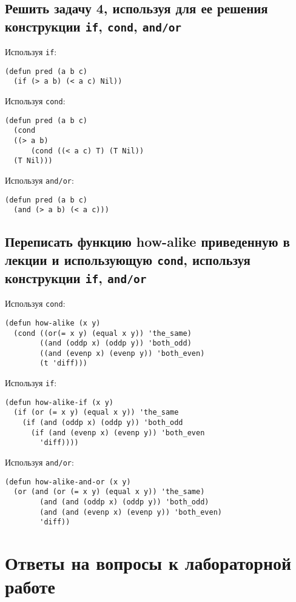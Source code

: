 \section{Решить задачу 4, используя для ее решения конструкции \texttt{if}, \texttt{cond}, \texttt{and/or}}

Используя \texttt{if}:
\begin{lstlisting}
(defun pred (a b c)
  (if (> a b) (< a c) Nil))
\end{lstlisting}

Используя \texttt{cond}:
\begin{lstlisting}
(defun pred (a b c)
  (cond 
  ((> a b) 
      (cond ((< a c) T) (T Nil))
  (T Nil)))
\end{lstlisting}

Используя \texttt{and/or}:
\begin{lstlisting}
(defun pred (a b c)
  (and (> a b) (< a c)))
\end{lstlisting}

\section{Переписать функцию how-alike приведенную в лекции и использующую \texttt{cond}, используя конструкции \texttt{if}, \texttt{and/or}}

Используя \texttt{cond}:
\begin{lstlisting}
(defun how-alike (x y)
  (cond ((or(= x y) (equal x y)) 'the_same)
        ((and (oddp x) (oddp y)) 'both_odd) 
        ((and (evenp x) (evenp y)) 'both_even) 
        (t 'diff)))
\end{lstlisting}

Используя \texttt{if}:
\begin{lstlisting}
(defun how-alike-if (x y)
  (if (or (= x y) (equal x y)) 'the_same
    (if (and (oddp x) (oddp y)) 'both_odd
      (if (and (evenp x) (evenp y)) 'both_even
        'diff))))
\end{lstlisting}

Используя \texttt{and/or}:
\begin{lstlisting}
(defun how-alike-and-or (x y)
  (or (and (or (= x y) (equal x y)) 'the_same)
        (and (and (oddp x) (oddp y)) 'both_odd)
        (and (and (evenp x) (evenp y)) 'both_even) 
        'diff))
\end{lstlisting}


\chapter{Ответы на вопросы к лабораторной работе}

